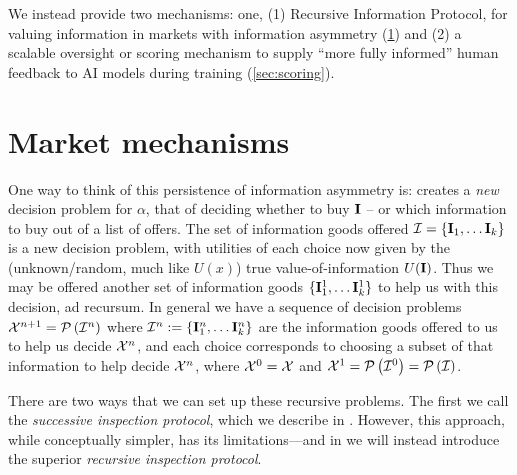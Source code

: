 We instead provide two mechanisms: one, (1) Recursive Information Protocol, for valuing information in markets with information asymmetry (\cref{sec:market}) and (2) a scalable oversight or scoring mechanism to supply ``more fully informed'' human feedback to AI models during training (\cref{sec:scoring}).

\section{Market mechanisms}
\label{sec:market}

One way to think of this persistence of information asymmetry is:  creates a \emph{new} decision problem for $\alpha$, that of deciding whether to buy $\mathbf{I}$ -- or which information to buy out of a list of offers. The set of information goods offered $\mathcal{I}=\{\mathbf{I}_1,\dots\mathbf{I}_k\}$ is a new decision problem, with utilities of each choice now given by the (unknown/random, much like $U(x)$) true value-of-information $U(\mathbf{I})$. Thus we may be offered another set of information goods $\{\mathbf{I}_1^1,\dots\mathbf{I}_k^1\}$ to help us with this decision, ad recursum. In general we have a sequence of decision problems $\mathcal{X}^{n+1}=\mathcal{P}\left(\mathcal{I}^n\right)$ where $\mathcal{I}^n:=\{\mathbf{I}_1^n,\dots\mathbf{I}_k^n\}$ are the information goods offered to us to help us decide $\mathcal{X}^n$, and each choice corresponds to choosing a subset of that information to help decide $\mathcal{X}^n$, where $\mathcal{X}^0 =\mathcal{X}$ and $\mathcal{X}^1=\mathcal{P}\left(\mathcal{I}^0\right)=\mathcal{P}\left(\mathcal{I}\right)$.


There are two ways that we can set up these recursive problems. The first we call the \emph{successive inspection protocol}, which we describe in . However, this approach, while conceptually simpler, has its limitations---and in  we will instead introduce the superior \emph{recursive inspection protocol}.

